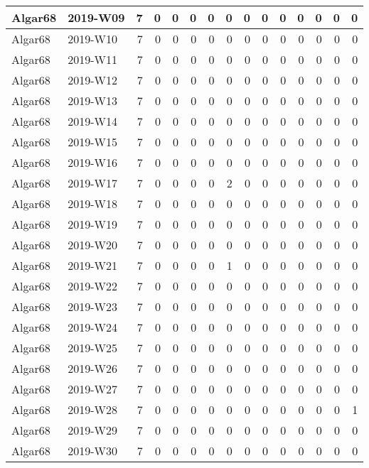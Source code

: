 \documentclass[]{book}
\begin{document}
\begin{table}
\begin{tabular}[t]{l|l|r|r|r|r|r|r|r|r|r|r|r|r|r}
\hline
Algar68 & 2019-W09 & 7 & 0 & 0 & 0 & 0 & 0 & 0 & 0 & 0 & 0 & 0 & 0 & 0\\
\hline
Algar68 & 2019-W10 & 7 & 0 & 0 & 0 & 0 & 0 & 0 & 0 & 0 & 0 & 0 & 0 & 0\\
\hline
Algar68 & 2019-W11 & 7 & 0 & 0 & 0 & 0 & 0 & 0 & 0 & 0 & 0 & 0 & 0 & 0\\
\hline
Algar68 & 2019-W12 & 7 & 0 & 0 & 0 & 0 & 0 & 0 & 0 & 0 & 0 & 0 & 0 & 0\\
\hline
Algar68 & 2019-W13 & 7 & 0 & 0 & 0 & 0 & 0 & 0 & 0 & 0 & 0 & 0 & 0 & 0\\
\hline
Algar68 & 2019-W14 & 7 & 0 & 0 & 0 & 0 & 0 & 0 & 0 & 0 & 0 & 0 & 0 & 0\\
\hline
Algar68 & 2019-W15 & 7 & 0 & 0 & 0 & 0 & 0 & 0 & 0 & 0 & 0 & 0 & 0 & 0\\
\hline
Algar68 & 2019-W16 & 7 & 0 & 0 & 0 & 0 & 0 & 0 & 0 & 0 & 0 & 0 & 0 & 0\\
\hline
Algar68 & 2019-W17 & 7 & 0 & 0 & 0 & 0 & 2 & 0 & 0 & 0 & 0 & 0 & 0 & 0\\
\hline
Algar68 & 2019-W18 & 7 & 0 & 0 & 0 & 0 & 0 & 0 & 0 & 0 & 0 & 0 & 0 & 0\\
\hline
Algar68 & 2019-W19 & 7 & 0 & 0 & 0 & 0 & 0 & 0 & 0 & 0 & 0 & 0 & 0 & 0\\
\hline
Algar68 & 2019-W20 & 7 & 0 & 0 & 0 & 0 & 0 & 0 & 0 & 0 & 0 & 0 & 0 & 0\\
\hline
Algar68 & 2019-W21 & 7 & 0 & 0 & 0 & 0 & 1 & 0 & 0 & 0 & 0 & 0 & 0 & 0\\
\hline
Algar68 & 2019-W22 & 7 & 0 & 0 & 0 & 0 & 0 & 0 & 0 & 0 & 0 & 0 & 0 & 0\\
\hline
Algar68 & 2019-W23 & 7 & 0 & 0 & 0 & 0 & 0 & 0 & 0 & 0 & 0 & 0 & 0 & 0\\
\hline
Algar68 & 2019-W24 & 7 & 0 & 0 & 0 & 0 & 0 & 0 & 0 & 0 & 0 & 0 & 0 & 0\\
\hline
Algar68 & 2019-W25 & 7 & 0 & 0 & 0 & 0 & 0 & 0 & 0 & 0 & 0 & 0 & 0 & 0\\
\hline
Algar68 & 2019-W26 & 7 & 0 & 0 & 0 & 0 & 0 & 0 & 0 & 0 & 0 & 0 & 0 & 0\\
\hline
Algar68 & 2019-W27 & 7 & 0 & 0 & 0 & 0 & 0 & 0 & 0 & 0 & 0 & 0 & 0 & 0\\
\hline
Algar68 & 2019-W28 & 7 & 0 & 0 & 0 & 0 & 0 & 0 & 0 & 0 & 0 & 0 & 0 & 1\\
\hline
Algar68 & 2019-W29 & 7 & 0 & 0 & 0 & 0 & 0 & 0 & 0 & 0 & 0 & 0 & 0 & 0\\
\hline
Algar68 & 2019-W30 & 7 & 0 & 0 & 0 & 0 & 0 & 0 & 0 & 0 & 0 & 0 & 0 & 0\\

\end{tabular}
\end{table}
\end{document}
